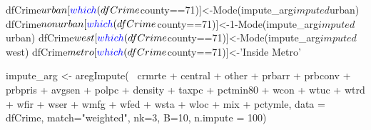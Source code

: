 \documentclass[]{article}
\newenvironment{Shaded}{}{}
\newcommand{\DataTypeTok}[1]{#1}
\newcommand{\DecValTok}[1]{#1}
\newcommand{\KeywordTok}[1]{\textcolor[rgb]{0.00,0.00,1.00}{#1}}
\newcommand{\NormalTok}[1]{#1}
\newcommand{\OperatorTok}[1]{#1}
\newcommand{\StringTok}[1]{\textcolor[rgb]{0.00,0.50,0.50}{#1}}
\begin{document}
\begin{Shaded}
\begin{Highlighting}[]
\NormalTok{dfCrime}\OperatorTok{$}\NormalTok{urban[}\KeywordTok{which}\NormalTok{(dfCrime}\OperatorTok{$}\NormalTok{county}\OperatorTok{==}\DecValTok{71}\NormalTok{)]<-}\KeywordTok{Mode}\NormalTok{(impute_arg}\OperatorTok{$}\NormalTok{imputed}\OperatorTok{$}\NormalTok{urban)}
\NormalTok{dfCrime}\OperatorTok{$}\NormalTok{nonurban[}\KeywordTok{which}\NormalTok{(dfCrime}\OperatorTok{$}\NormalTok{county}\OperatorTok{==}\DecValTok{71}\NormalTok{)]<-}\DecValTok{1}\OperatorTok{-}\KeywordTok{Mode}\NormalTok{(impute_arg}\OperatorTok{$}\NormalTok{imputed}\OperatorTok{$}\NormalTok{urban)}
\NormalTok{dfCrime}\OperatorTok{$}\NormalTok{west[}\KeywordTok{which}\NormalTok{(dfCrime}\OperatorTok{$}\NormalTok{county}\OperatorTok{==}\DecValTok{71}\NormalTok{)]<-}\KeywordTok{Mode}\NormalTok{(impute_arg}\OperatorTok{$}\NormalTok{imputed}\OperatorTok{$}\NormalTok{west)}
\NormalTok{dfCrime}\OperatorTok{$}\NormalTok{metro[}\KeywordTok{which}\NormalTok{(dfCrime}\OperatorTok{$}\NormalTok{county}\OperatorTok{==}\DecValTok{71}\NormalTok{)]<-}\StringTok{'Inside Metro'}
\end{Highlighting}
\end{Shaded}

\begin{Shaded}
\begin{Highlighting}[]
\NormalTok{impute_arg <-}\StringTok{ }\KeywordTok{aregImpute}\NormalTok{(}\OperatorTok{~}\StringTok{ }\NormalTok{crmrte }\OperatorTok{+}\StringTok{ }\NormalTok{central }\OperatorTok{+}\StringTok{ }\NormalTok{other }\OperatorTok{+}
\StringTok{                         }\NormalTok{prbarr }\OperatorTok{+}\StringTok{ }\NormalTok{prbconv }\OperatorTok{+}\StringTok{ }\NormalTok{prbpris }\OperatorTok{+}\StringTok{ }\NormalTok{avgsen }\OperatorTok{+}\StringTok{ }\NormalTok{polpc }\OperatorTok{+}
\StringTok{                         }\NormalTok{density }\OperatorTok{+}\StringTok{ }\NormalTok{taxpc }\OperatorTok{+}\StringTok{ }\NormalTok{pctmin80 }\OperatorTok{+}\StringTok{ }\NormalTok{wcon }\OperatorTok{+}\StringTok{ }\NormalTok{wtuc }\OperatorTok{+}
\StringTok{                         }\NormalTok{wtrd }\OperatorTok{+}\StringTok{ }\NormalTok{wfir }\OperatorTok{+}\StringTok{ }\NormalTok{wser }\OperatorTok{+}\StringTok{ }\NormalTok{wmfg }\OperatorTok{+}\StringTok{ }\NormalTok{wfed }\OperatorTok{+}\StringTok{ }\NormalTok{wsta }\OperatorTok{+}\StringTok{ }\NormalTok{wloc }\OperatorTok{+}
\StringTok{                         }\NormalTok{mix }\OperatorTok{+}\StringTok{ }\NormalTok{pctymle, }\DataTypeTok{data =}\NormalTok{ dfCrime, }\DataTypeTok{match=}\StringTok{"weighted"}\NormalTok{,}
                         \DataTypeTok{nk=}\DecValTok{3}\NormalTok{, }\DataTypeTok{B=}\DecValTok{10}\NormalTok{, }\DataTypeTok{n.impute =} \DecValTok{100}\NormalTok{)}
\end{Highlighting}
\end{Shaded}
\end{document}

